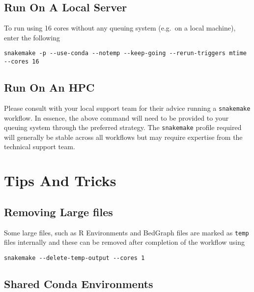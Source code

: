 \documentclass[
]{book}
\begin{document}
\hypertarget{run-on-a-local-server}{%
\subsection{Run On A Local Server}\label{run-on-a-local-server}}

To run using 16 cores without any queuing system (e.g.~on a local machine), enter the following

\begin{verbatim}
snakemake -p --use-conda --notemp --keep-going --rerun-triggers mtime --cores 16
\end{verbatim}

\hypertarget{run-on-an-hpc}{%
\subsection{Run On An HPC}\label{run-on-an-hpc}}

Please consult with your local support team for their advice running a \texttt{snakemake} workflow.
In essence, the above command will need to be provided to your queuing system through the preferred strategy.
The \texttt{snakemake} profile required will generally be stable across all workflows but may require expertise from the technical support team.

\hypertarget{tips-and-tricks}{%
\section{Tips And Tricks}\label{tips-and-tricks}}

\hypertarget{removing-large-files}{%
\subsection{Removing Large files}\label{removing-large-files}}

Some large files, such as R Environments and BedGraph files are marked as \texttt{temp} files internally and these can be removed after completion of the workflow using

\begin{verbatim}
snakemake --delete-temp-output --cores 1
\end{verbatim}

\hypertarget{shared-conda-environments}{%
\subsection{Shared Conda Environments}\label{shared-conda-environments}}
\end{document}
